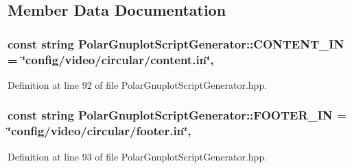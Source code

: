 \subsection{Member Data Documentation}
\hypertarget{classmultiscale_1_1video_1_1PolarGnuplotScriptGenerator_ad8fb67fe439899d85924bd7339b7d08c}{
\subsubsection[{C\-O\-N\-T\-E\-N\-T\-\_\-\-I\-N}]{\setlength{\rightskip}{0pt plus 5cm}const string Polar\-Gnuplot\-Script\-Generator\-::\-C\-O\-N\-T\-E\-N\-T\-\_\-\-I\-N = \char`\"{}config/video/circular/content.\-in\char`\"{}\hspace{0.3cm}{\ttfamily [static]}, {\ttfamily [private]}}}\label{classmultiscale_1_1video_1_1PolarGnuplotScriptGenerator_ad8fb67fe439899d85924bd7339b7d08c}


Definition at line 92 of file Polar\-Gnuplot\-Script\-Generator.\-hpp.

\hypertarget{classmultiscale_1_1video_1_1PolarGnuplotScriptGenerator_aae225d7380fd7815efa1aed69087e6b0}{
\subsubsection[{F\-O\-O\-T\-E\-R\-\_\-\-I\-N}]{\setlength{\rightskip}{0pt plus 5cm}const string Polar\-Gnuplot\-Script\-Generator\-::\-F\-O\-O\-T\-E\-R\-\_\-\-I\-N = \char`\"{}config/video/circular/footer.\-in\char`\"{}\hspace{0.3cm}{\ttfamily [static]}, {\ttfamily [private]}}}\label{classmultiscale_1_1video_1_1PolarGnuplotScriptGenerator_aae225d7380fd7815efa1aed69087e6b0}


Definition at line 93 of file Polar\-Gnuplot\-Script\-Generator.\-hpp.

